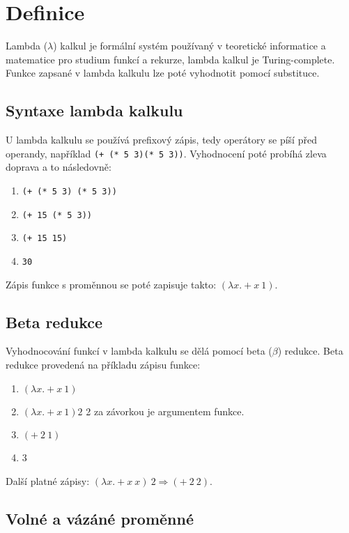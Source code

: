 \documentclass{szzclass}
\author{
    Tomáš Starý
    \and
    Daniel Hampl
}
\begin{document}
\tableofcontents
\newpage

\section{Definice}

Lambda ($\lambda$) kalkul je formální systém používaný v teoretické informatice a matematice pro studium funkcí a rekurze, lambda kalkul je Turing-complete.
Funkce zapsané v lambda kalkulu lze poté vyhodnotit pomocí substituce.

\subsection{Syntaxe lambda kalkulu}

U lambda kalkulu se používá prefixový zápis, tedy operátory se píší před operandy, například \texttt{(+ (* 5 3)(* 5 3))}.
Vyhodnocení poté probíhá zleva doprava a to následovně:
\begin{enumerate}
    \item \texttt{(+ (* 5 3) (* 5 3))}
    \item \texttt{(+ 15 (* 5 3))}
    \item \texttt{(+ 15 15)}
    \item \texttt{30}
\end{enumerate}

Zápis funkce s proměnnou se poté zapisuje takto: $(\lambda x. + x\ 1)$.

\subsection{Beta redukce}

Vyhodnocování funkcí v lambda kalkulu se dělá pomocí beta ($\beta$) redukce.
Beta redukce provedená na příkladu zápisu funkce:
\begin{enumerate}
    \item $(\lambda x. + x\ 1)$
    \item $(\lambda x. + x\ 1)2$
          2 za závorkou je argumentem funkce.
    \item $(+\ 2\ 1)$
    \item 3
\end{enumerate}


Další platné zápisy: $(\lambda x. + x\ x)\ 2 \Rightarrow (+\ 2\ 2)$.

\subsection{Volné a vázáné proměnné}
\end{document}

